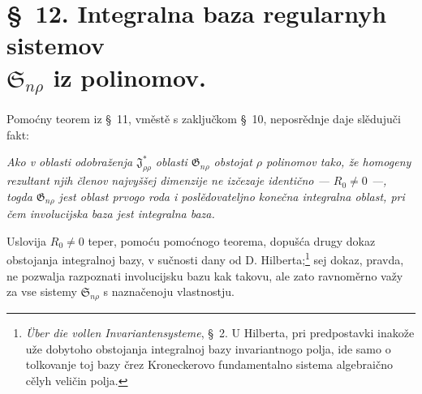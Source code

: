 \documentclass[11pt]{article}
\providecommand{\Ssys}{\mathfrak{S}}
\providecommand{\Jdom}{\mathfrak{J}}
\providecommand{\Gdom}{\mathfrak{G}}
\begin{document}
\section*{\S\ 12. Integralna baza regularnyh sistemov\\ $\Ssys_{n\rho}$ iz polinomov.}

Pomoćny teorem iz \S\ 11, vměstě s zaključkom \S\ 10, neposrědnje daje slědujuči fakt:

{\itshape Ako v oblasti odobraženja $\Jdom^*_{\rho\rho}$ oblasti $\Gdom_{n\rho}$ obstojat $\rho$ polinomov tako, že homogeny rezultant njih členov najvyššej dimenzije ne izčezaje identično --- $R_0\ne0$ ---, togda $\Gdom_{n\rho}$ jest oblast prvogo roda i poslědovateljno konečna integralna oblast, pri čem involucijska baza jest integralna baza.}

Uslovija $R_0\ne0$ teper, pomoću pomoćnogo teorema, dopušća drugy dokaz obstojanja integralnoj bazy, v sučnosti dany od D. Hilberta;\footnote{\emph{Über die vollen Invariantensysteme}, \S\ 2. U Hilberta, pri predpostavki inakože uže dobytoho obstojanja integralnoj bazy invariantnogo polja, ide samo o tolkovanje toj bazy črez Kroneckerovo fundamentalno sistema algebraično cělyh veličin polja.} sej dokaz, pravda, ne pozwalja razpoznati involucijsku bazu kak takovu, ale zato ravnoměrno važy za vse sistemy $\Ssys_{n\rho}$ s naznačenoju vlastnostju.
\end{document}
